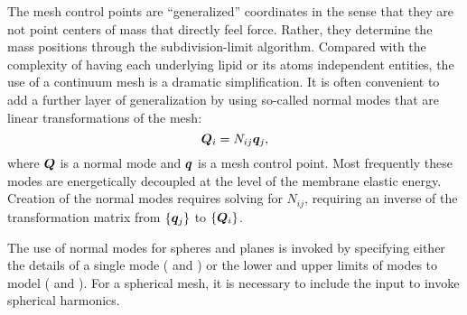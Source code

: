 
The mesh control points are ``generalized'' coordinates in the sense that they are not point centers of mass that directly feel force.
Rather, they determine the mass positions through the subdivision-limit algorithm.
Compared with the complexity of having each underlying lipid or its atoms independent entities, the use of a continuum mesh is a dramatic simplification.
It is often convenient to add a further layer of generalization by using so-called normal modes that are linear transformations of the mesh:
\begin{equation}
\boldsymbol{Q}_i = N_{ij} \boldsymbol{q}_j,  
\end{equation}
where $\boldsymbol{Q}$ is a normal mode and $\boldsymbol{q}$ is a mesh control point. 
Most frequently these modes are energetically decoupled at the level of the membrane elastic energy.
Creation of the normal modes requires solving for $N_{ij}$, requiring an inverse of the transformation matrix from $\{ \boldsymbol{q}_j \}$ to $\{ \boldsymbol{Q}_i \}$.

The use of normal modes for spheres and planes is invoked by specifying either 
the details of a single mode ( and ) or the lower and upper limits of modes to model ( and ).  
For a spherical mesh, it is necessary to include the input  to invoke spherical harmonics. 
